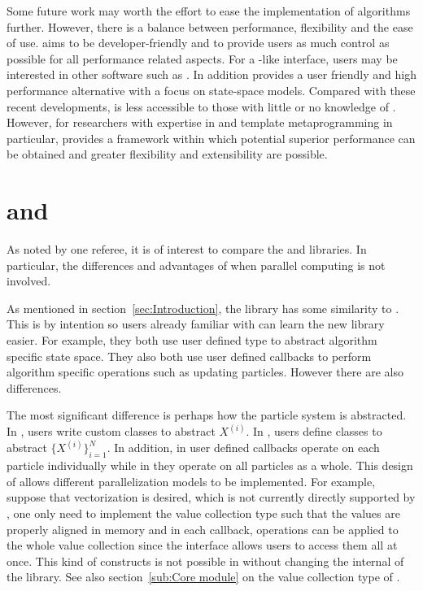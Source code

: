 \documentclass[11pt, bib, hyper, mint, minted=cache]{marticle}
\begin{document}
Some future work may worth the effort to ease the implementation of \smc
algorithms further. However, there is a balance between performance,
flexibility and the ease of use. \vsmc aims to be developer-friendly and to
provide users as much control as possible for all performance related aspects.
For a \lbugs-like interface, users may be interested in other software such as
\fbiips \parencite{BiiPS}. In addition \flibbi \parencite{Murray2013bi}
provides a user friendly and high performance alternative with a focus on
state-space models. Compared with these recent developments, \vsmc is less
accessible to those with little or no knowledge of \cpp. However, for
researchers with expertise in \cpp and template metaprogramming in particular,
\vsmc provides a framework within which potential superior performance can be
obtained and greater flexibility and extensibility are possible.

\clearpage
\appendix

\section[vSMC and SMCTC]{\protect\vsmc and \protect\smctc}
\label{sec:vsmc and smctc}

As noted by one referee, it is of interest to compare the \vsmc and \lsmctc
libraries. In particular, the differences and advantages of \vsmc when
parallel computing is not involved.

As mentioned in section~\ref{sec:Introduction}, the \vsmc library has some
similarity to \lsmctc. This is by intention so users already familiar with
\lsmctc can learn the new library easier. For example, they both use user
defined type to abstract algorithm specific state space. They also both use
user defined callbacks to perform algorithm specific operations such as
updating particles. However there are also differences.

The most significant difference is perhaps how the particle system is
abstracted. In \lsmctc, users write custom classes to abstract $X^{(i)}$. In
\vsmc, users define classes to abstract $\{X^{(i)}\}_{i=1}^N$. In addition, in
\lsmctc user defined callbacks operate on each particle individually while in
\vsmc they operate on all particles as a whole. This design of \vsmc allows
different parallelization models to be implemented. For example, suppose that
\simd vectorization is desired, which is not currently directly supported by
\vsmc, one only need to implement the value collection type such that the
values are properly aligned in memory and in each callback, \simd operations
can be applied to the whole value collection since the \vsmc interface allows
users to access them all at once. This kind of constructs is not possible in
\lsmctc without changing the internal of the library. See also
section~\ref{sub:Core module} on the value collection type of \vsmc.
\end{document}
